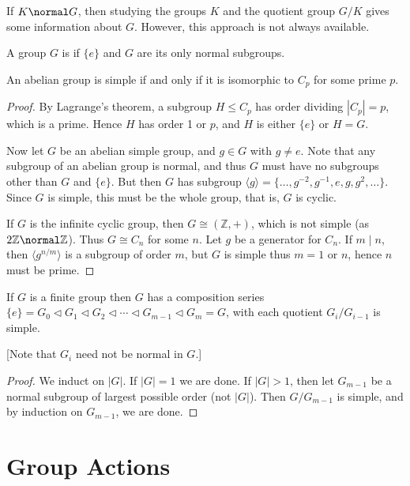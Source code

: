 \documentclass[a4paper]{scrartcl}
\begin{document}
If $K \normal G$, then studying the groups $K$ and the quotient group $G/K$ gives some information about $G$. However, this approach is not always available.

\begin{definition}
	A group $G$ is  if $\{e\}$ and $G$ are its only normal subgroups.
\end{definition}

\begin{lemma}
	An abelian group is simple if and only if it is isomorphic to $C_p$ for some prime $p$.
\end{lemma}
\begin{proof}
	By Lagrange's theorem, a subgroup $H \leq C_p$ has order dividing $|C_p| = p$, which is a prime. Hence $H$ has order 1 or $p$, and $H$ is either $\{e\}$ or $H = G$.

	Now let $G$ be an abelian simple group, and $g \in G$ with $g \neq e$. Note that any subgroup of an abelian group is normal, and thus $G$ must have no subgroups other than $G$ and $\{e\}$. But then $G$ has subgroup $\langle g \rangle = \{\dots, g^{-2}, g^{-1}, e, g, g^2, \dots \}$. Since $G$ is simple, this must be the whole group, that is, $G$ is cyclic.

	If $G$ is the infinite cyclic group, then $G \cong (\mathbb{Z}, +)$, which is not simple (as $2 \mathbb{Z} \normal \mathbb{Z}$). Thus $G \cong C_n$ for some $n$. Let $g$ be a generator for $C_n$. If $m \mid n$, then $\langle g^{n/m} \rangle$ is a subgroup of order $m$, but $G$ is simple thus $m = 1$ or $n$, hence $n$ must be prime.
\end{proof}

\begin{lemma}
	If $G$ is a finite group then $G$ has a composition series $\{e\} = G_0 \triangleleft G_1 \triangleleft G_2 \triangleleft \cdots \triangleleft G_{m- 1} \triangleleft G_m = G$, with each quotient $G_i / G_{i - 1}$ is simple.

	[Note that $G_i$ need not be normal in $G$.]
\end{lemma}
\begin{proof}
	We induct on $|G|$. If $|G| = 1$ we are done. If $|G| > 1$, then let $G_{m - 1}$ be a normal subgroup of largest possible order (not $|G|$). Then $G/G_{m - 1}$ is simple, and by induction on $G_{m - 1}$, we are done.
\end{proof}


\section{Group Actions}
\end{document}
